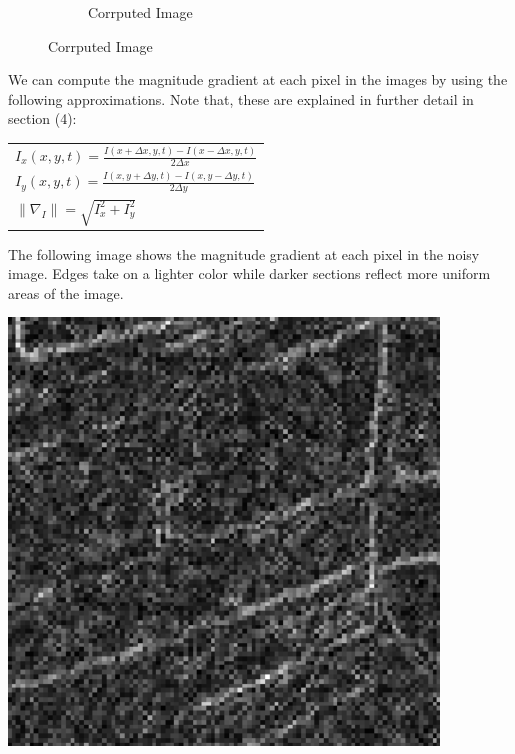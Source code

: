 \documentclass{article}
\begin{document}
\begin{figure}[!htb]
\begin{center}
\begin{subfigure}[b]{0.4\textwidth}
        \caption{Corrputed Image}
      \end{subfigure}
    \end{center}
  \end{figure}

  \noindent
  We can compute the magnitude gradient at each pixel in the images by using the following
  approximations. Note that, these are explained in further detail in section (4):
  \begin{center}
    \begin{tabular}{l}
      \vspace{12pt}
      $I_{x}(x,y,t) = \frac{I(x+\Delta x,y,t) - I(x-\Delta x,y,t)}{2\Delta x}$\\
      \vspace{12pt}
      $I_{y}(x,y,t) = \frac{I(x,y+\Delta y,t) - I(x,y-\Delta y,t)}{2\Delta y}$\\
      $\| \nabla_{I} \| = \sqrt{I_{x}^2 + I_{y}^2}$\\
    \end{tabular}
  \end{center}

  \noindent
  The following image shows the magnitude gradient at each pixel in the noisy image.
  Edges take on a lighter color while darker sections reflect more uniform areas of the image.
  \begin{center}
    \includegraphics[scale=0.5]{../report_images/noisy_grad.png}
  \end{center}
\end{document}

